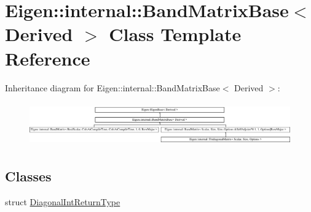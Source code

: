 \hypertarget{class_eigen_1_1internal_1_1_band_matrix_base}{}\section{Eigen\+::internal\+::Band\+Matrix\+Base$<$ Derived $>$ Class Template Reference}
\label{class_eigen_1_1internal_1_1_band_matrix_base}
Inheritance diagram for Eigen\+::internal\+::Band\+Matrix\+Base$<$ Derived $>$\+:\begin{figure}[H]
\begin{center}
\leavevmode
\includegraphics[height=1.904762cm]{class_eigen_1_1internal_1_1_band_matrix_base}
\end{center}
\end{figure}
\subsection*{Classes}
\begin{DoxyCompactItemize}
\item 
struct \mbox{\hyperlink{struct_eigen_1_1internal_1_1_band_matrix_base_1_1_diagonal_int_return_type}{Diagonal\+Int\+Return\+Type}}
\end{DoxyCompactItemize}
